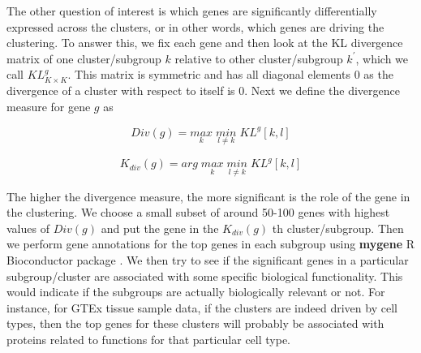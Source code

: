 The other question of interest is which genes are significantly differentially expressed across the clusters, or in other words, which genes are driving the clustering. To answer this, we fix each gene and then look at the KL divergence matrix of one cluster/subgroup $k$ relative to other cluster/subgroup $k^{'}$, which we call $KL^{g}_{K \times K}$. This matrix is symmetric and has all diagonal elements $0$ as the divergence of a cluster with respect to itself is $0$. Next we define the divergence measure for gene $g$ as 

$$ Div(g) = \underset{k}{max} \; \underset{l \neq k}{min} \; KL^{g} [k, l] $$

$$ K_{div}(g) = arg \;  \underset{k}{max} \; \underset{l \neq k}{min}  \; KL^{g} [k, l] $$


The higher the divergence measure, the more significant is the role of the gene in the clustering. We choose a small subset of around 50-100 genes with highest values of $Div(g)$ and put the gene in the $K_{div}(g)$ th cluster/subgroup. Then we perform gene annotations for the top genes in each subgroup using \textbf{mygene} R Bioconductor package \cite{Thompson2014}. We then try to see if the significant genes in a particular subgroup/cluster are associated with some specific biological functionality. This would indicate if the subgroups are actually biologically relevant or not. For instance, for GTEx tissue sample data, if the clusters are indeed driven by cell types, then the top genes for these clusters will probably be associated with proteins related to  functions for that particular cell type.


\medskip
















 









